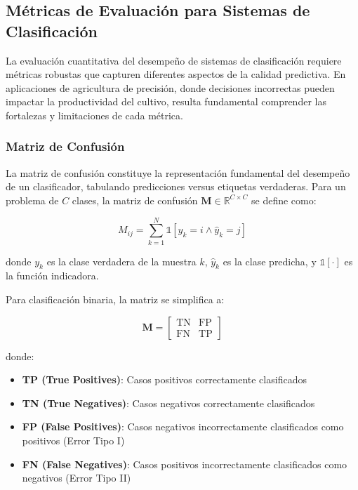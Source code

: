 \subsection{Métricas de Evaluación para Sistemas de Clasificación}

La evaluación cuantitativa del desempeño de sistemas de clasificación requiere métricas robustas que capturen diferentes aspectos de la calidad predictiva. En aplicaciones de agricultura de precisión, donde decisiones incorrectas pueden impactar la productividad del cultivo, resulta fundamental comprender las fortalezas y limitaciones de cada métrica.

\subsubsection{Matriz de Confusión}

La matriz de confusión constituye la representación fundamental del desempeño de un clasificador, tabulando predicciones versus etiquetas verdaderas. Para un problema de $C$ clases, la matriz de confusión $\mathbf{M} \in \mathbb{R}^{C \times C}$ se define como:

\begin{equation}
M_{ij} = \sum_{k=1}^{N} \mathbb{1}[y_k = i \land \hat{y}_k = j]
\end{equation}

donde $y_k$ es la clase verdadera de la muestra $k$, $\hat{y}_k$ es la clase predicha, y $\mathbb{1}[\cdot]$ es la función indicadora.

Para clasificación binaria, la matriz se simplifica a:

\begin{equation}
\mathbf{M} = \begin{bmatrix}
\text{TN} & \text{FP} \\
\text{FN} & \text{TP}
\end{bmatrix}
\end{equation}

donde:
\begin{itemize}
\item \textbf{TP (True Positives)}: Casos positivos correctamente clasificados
\item \textbf{TN (True Negatives)}: Casos negativos correctamente clasificados  
\item \textbf{FP (False Positives)}: Casos negativos incorrectamente clasificados como positivos (Error Tipo I)
\item \textbf{FN (False Negatives)}: Casos positivos incorrectamente clasificados como negativos (Error Tipo II)
\end{itemize}

